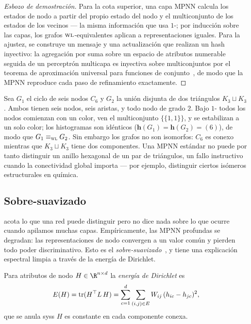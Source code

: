 \begin{proof}[Esbozo de demostraci\'on]
Para la cota superior, una capa MPNN calcula los estados de nodo a partir del
propio estado del nodo y el multiconjunto de los estados de los vecinos --- la
misma informaci\'on que usa $1$-\WL; por inducci\'on sobre las capas, los grafos
$\textsc{wl}$-equivalentes aplican a representaciones iguales. Para la ajustez, se
construye un mensaje y una actualizaci\'on que realizan un hash inyectivo: la
agregaci\'on por suma sobre un espacio de atributos numerable seguida de un
perceptr\'on multicapa es inyectiva sobre multiconjuntos por el teorema de
aproximaci\'on universal para funciones de conjunto~\citep{zaheer2017deepsets}, de
modo que la MPNN reproduce cada paso de refinamiento exactamente.
\end{proof}

\begin{example}
\label{ex:graphs:wl-fail}
Sea $G_1$ el ciclo de seis nodos $C_6$ y $G_2$ la uni\'on disjunta de dos
tri\'angulos $K_3 \sqcup K_3$. Ambos tienen seis nodos, seis aristas, y todo nodo
de grado $2$. Bajo $1$-\WL{} todos los nodos comienzan con un color, ven el
multiconjunto $\{\!\{1,1\}\!\}$, y se estabilizan a un solo color; los histogramas
son id\'enticos ($\mathbf{h}(G_1) = \mathbf{h}(G_2) = (6)$), de modo que
$G_1 \equiv_{\textsc{wl}} G_2$. Sin embargo los grafos no son isomorfos: $C_6$ es conexo
mientras que $K_3 \sqcup K_3$ tiene dos componentes. Una MPNN est\'andar no puede
por tanto distinguir un anillo hexagonal de un par de tri\'angulos, un fallo
instructivo cuando la conectividad global importa --- por ejemplo, distinguir
ciertos is\'omeros estructurales en qu\'imica.
\end{example}

\subsection{Sobre-suavizado}
\label{sec:graphs:oversmoothing}

 acota lo que una red puede distinguir pero no dice nada
sobre lo que ocurre cuando apilamos muchas capas. Emp\'iricamente, las MPNN
profundas se degradan: las representaciones de nodo convergen a un valor com\'un y
pierden todo poder discriminativo. Esto es el \emph{sobre-suavizado}~\citep%
{li2018deeper}, y tiene una explicaci\'on espectral limpia a trav\'es de la
energ\'ia de Dirichlet.

\begin{definition}
\label{def:graphs:dirichlet}
Para atributos de nodo $H \in \R^{n \times d}$ la \emph{energ\'ia de Dirichlet} es
\[
  E(H) = \operatorname{tr}(H^\top L\, H)
       = \sum_{c=1}^d \sum_{(i,j) \in E} W_{ij}\,(h_{ic} - h_{jc})^2 ,
\]
que se anula syss $H$ es constante en cada componente conexa.
\end{definition}

